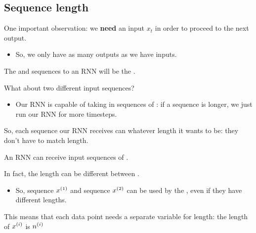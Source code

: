     \phantom{}

    \subsection{Sequence length}
    
        One important observation: we \textbf{need} an input $x_t$ in order to proceed to the next output.

        \begin{itemize}
            \item So, we only have as many outputs as we have inputs.\\
        \end{itemize}

        \begin{concept}
            The  and  sequences to an RNN will be the .
        \end{concept}

        What about two different input sequences? 

        \begin{itemize}
            \item Our RNN is capable of taking in sequences of : if a sequence is longer, we just run our RNN for more timesteps.
        \end{itemize}

        So, each sequence our RNN receives can whatever length it wants to be: they don't have to match length.\\

        \begin{concept}
            An RNN can receive input sequences of .

            In fact, the length can be different between .

            \begin{itemize}
                \item So, sequence $x^{(1)}$ and sequence $x^{(2)}$ can be used by the , even if they have different lengths.
            \end{itemize}

            \subsecdiv

            This means that each data point needs a separate variable for length: the length of $x^{(i)}$ is $n^{(i)}$
            
        \end{concept}

